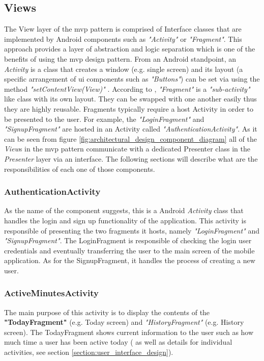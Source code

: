         \subsection{Views}
        The View layer of the \gls{mvp} pattern is comprised of Interface classes that are implemented by Android components such as \textit{"Activity"} or \textit{"Fragment"}. This approach provides a layer of abstraction and logic separation which is one of the benefits of using the \gls{mvp} design pattern. From an Android standpoint, an \textit{Activity} is a class that creates a window (e.g. single screen) and its layout (a specific arrangement of \gls{ui} components such as \textit{"Buttons"}) can be set via using the method \textit{"setContentView(View)"} \citep{googleactivity2017}. According to \citet{googlefragments2017}, \textit{"Fragment"} is a \textit{"sub-activity"} like class with its own layout. They can be swapped with one another easily thus they are highly reusable. Fragments typically require a host Activity in order to be presented to the user. For example, the \textit{"LoginFragment"} and \textit{"SignupFragment"} are hosted in an Activity called \textit{"AuthenticationActivity"}. As it can be seen from figure \ref{fig:architectural_design_component_diagram} all of the \textit{View}s in the \gls{mvp} pattern communicate with a dedicated Presenter class in the \textit{Presenter} layer via an interface. The following sections will describe what are the responsibilities of each one of those components.
            
            \subsubsection{AuthenticationActivity}
            As the name of the component suggests, this is a Android \textit{Activity} class that handles the login and sign up functionality of the application. This activity is responsible of presenting the two fragments it hosts, namely \textit{"LoginFragment"} and \textit{"SignupFragment"}. The LoginFragment is responsible of checking the login user credentials and eventually transferring the user to the main screen of the mobile application. As for the SignupFragment, it handles the process of creating a new user.
            
            \subsubsection{ActiveMinutesActivity}
            The main purpose of this activity is to display the contents of the \textbf{"TodayFragment"} (e.g. Today screen) and \textit{"HistoryFragment"} (e.g. History screen). The TodayFragment shows current information to the user such as how much time a user has been active today ( as well as details for individual activities, see section \ref{section:user_interface_design}).
            
